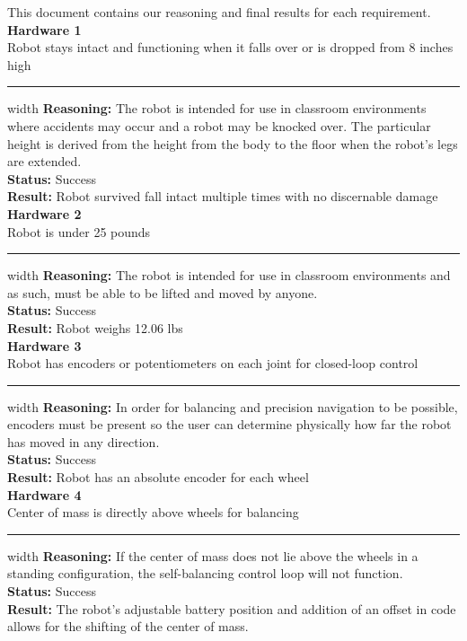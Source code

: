 \documentclass{fank1basedocument}
\begin{document}
This document contains our reasoning and final results for each requirement.\\

{\large \textbf{Hardware 1}}\\
Robot stays intact and functioning when it falls over or is dropped from 8 inches high
\hrule width \linewidth
\vspace{2px}
\textbf{Reasoning:} The robot is intended for use in classroom environments where accidents may occur and a robot may be knocked over. The particular height is derived from the height from the body to the floor when the robot’s legs are extended.\\
\textbf{Status:} \color{ForestGreen}Success\color{black}\\
\textbf{Result:} Robot survived fall intact multiple times with no discernable damage\\

{\large \textbf{Hardware 2}}\\
Robot is under 25 pounds
\hrule width \linewidth
\vspace{2px}
\textbf{Reasoning:} The robot is intended for use in classroom environments and as such, must be able to be lifted and moved by anyone.\\
\textbf{Status:} \color{ForestGreen}Success\color{black}\\
\textbf{Result:} Robot weighs 12.06 lbs\\

{\large \textbf{Hardware 3}}\\
Robot has encoders or potentiometers on each joint for closed-loop control
\hrule width \linewidth
\vspace{2px}
\textbf{Reasoning:} In order for balancing and precision navigation to be possible, encoders must be present so the user can determine physically how far the robot has moved in any direction.\\
\textbf{Status:} \color{ForestGreen}Success\color{black}\\
\textbf{Result:} Robot has an absolute encoder for each wheel\\

{\large \textbf{Hardware 4}}\\
Center of mass is directly above wheels for balancing
\hrule width \linewidth
\vspace{2px}
\textbf{Reasoning:} If the center of mass does not lie above the wheels in a standing configuration, the self-balancing control loop will not function.\\
\textbf{Status:} \color{ForestGreen}Success\color{black}\\
\textbf{Result:} The robot’s adjustable battery position and addition of an offset in code allows for the shifting of the center of mass.\\
\end{document}
